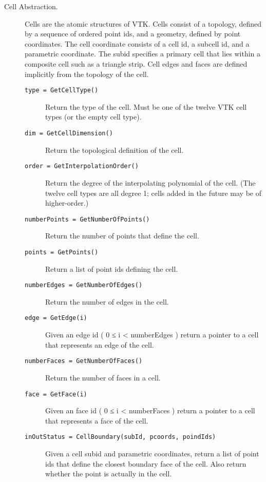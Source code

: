 \begin{description}
\item[Cell Abstraction.] Cells are the atomic structures of VTK. Cells consist of a topology, defined by a sequence of ordered point ids, and a geometry, defined by point coordinates. The cell coordinate consists of a cell id, a subcell id, and a parametric coordinate. The subid specifies a primary cell that lies within a composite cell such as a triangle strip. Cell edges and faces are defined implicitly from the topology of the cell.
    \begin{description}

    \item[\texttt{type = GetCellType()}]
    Return the type of the cell. Must be one of the twelve VTK cell types (or the empty cell type).

    \item[\texttt{dim = GetCellDimension()}]
    Return the topological definition of the cell.

    \item[\texttt{order = GetInterpolationOrder()}]
    Return the degree of the interpolating polynomial of the cell. (The twelve cell types are all degree 1; cells added in the future may be of higher-order.)

    \item[\texttt{numberPoints = GetNumberOfPoints()}]
    Return the number of points that define the cell.

    \item[\texttt{points = GetPoints()}]
    Return a list of point ids defining the cell.

    \item[\texttt{numberEdges = GetNumberOfEdges()}]
    Return the number of edges in the cell.

    \item[\texttt{edge = GetEdge(i)}]
    Given an edge id ( 0 ≤ i < numberEdges ) return a pointer to a cell that represents an edge of the cell.

    \item[\texttt{numberFaces = GetNumberOfFaces()}]
    Return the number of faces in a cell.

    \item[\texttt{face = GetFace(i)}]
    Given an face id ( 0 ≤ i < numberFaces ) return a pointer to a cell that represents a face of the cell.

    \item[\texttt{inOutStatus = CellBoundary(subId, pcoords, poindIds)}]
    Given a cell subid and parametric coordinates, return a list of point ids that define the closest boundary face of the cell. Also return whether the point is actually in the cell.


\end{description}
\end{description}
